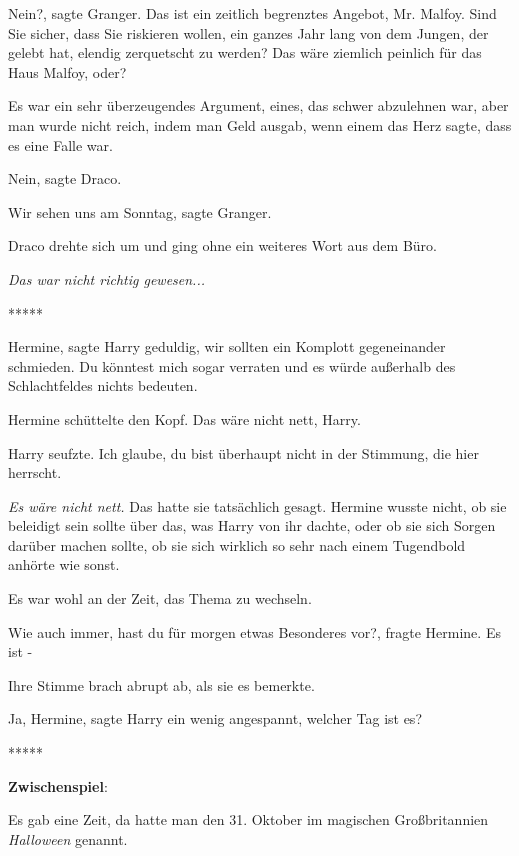 \glqq{}Nein?\grqq{}, sagte Granger. \glqq{}Das ist ein zeitlich begrenztes
Angebot, Mr. Malfoy. Sind Sie sicher, dass Sie riskieren wollen, ein ganzes Jahr
lang von dem Jungen, der gelebt hat, elendig zerquetscht zu werden? Das wäre
ziemlich peinlich für das Haus Malfoy, oder?\grqq{}

Es war ein sehr überzeugendes Argument, eines, das schwer abzulehnen war, aber
man wurde nicht reich, indem man Geld ausgab, wenn einem das Herz sagte, dass es
eine Falle war.

\glqq{}Nein\grqq{}, sagte Draco.

\glqq{}Wir sehen uns am Sonntag\grqq{}, sagte Granger.

Draco drehte sich um und ging ohne ein weiteres Wort aus dem Büro.

\emph{Das war nicht richtig gewesen...}

\begin{center}*****\end{center}

\glqq{}Hermine\grqq{}, sagte Harry geduldig, \glqq{}wir sollten ein Komplott
gegeneinander schmieden. Du könntest mich sogar verraten und es würde außerhalb
des Schlachtfeldes nichts bedeuten.\grqq{}

Hermine schüttelte den Kopf. \glqq{}Das wäre nicht nett, Harry.\grqq{}

Harry seufzte. \glqq{}Ich glaube, du bist überhaupt nicht in der Stimmung, die
hier herrscht.\grqq{}

\emph{Es wäre nicht nett.} Das hatte sie tatsächlich gesagt. Hermine wusste
nicht, ob sie beleidigt sein sollte über das, was Harry von ihr dachte, oder ob
sie sich Sorgen darüber machen sollte, ob sie sich wirklich so sehr nach einem
Tugendbold anhörte wie sonst.

Es war wohl an der Zeit, das Thema zu wechseln.

\glqq{}Wie auch immer, hast du für morgen etwas Besonderes vor?\grqq{}, fragte
Hermine. \glqq{}Es ist -

\grqq{}Ihre Stimme brach abrupt ab, als sie es bemerkte.

\glqq{}Ja, Hermine\grqq{}, sagte Harry ein wenig angespannt, \glqq{}welcher Tag
ist es?\grqq{}

\begin{center}*****\end{center}

\textbf{Zwischenspiel}:

Es gab eine Zeit, da hatte man den 31. Oktober im magischen Großbritannien
\emph{Halloween} genannt.

